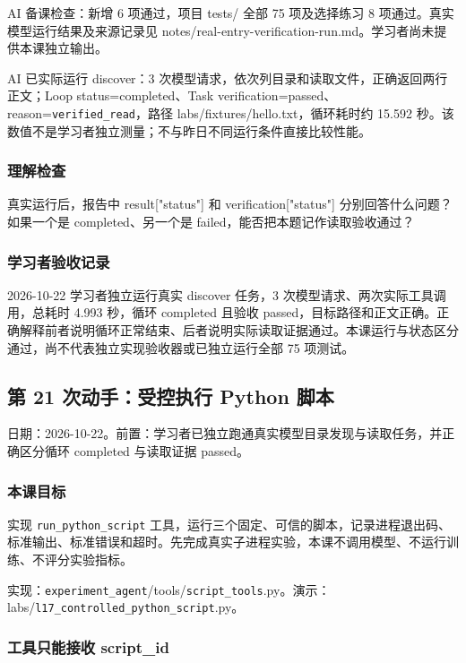 \documentclass[UTF8,zihao=-4,fontset=fandol]{ctexart}
\begin{document}
AI 备课检查：新增 6 项通过，项目 tests/ 全部 75 项及选择练习 8 项通过。真实模型运行结果及来源记录见 notes/real-entry-verification-run.md。学习者尚未提供本课独立输出。

AI 已实际运行 discover：3 次模型请求，依次列目录和读取文件，正确返回两行正文；Loop status=completed、Task verification=passed、reason=\nolinkurl{verified_read}，路径 labs/fixtures/hello.txt，循环耗时约 15.592 秒。该数值不是学习者独立测量；不与昨日不同运行条件直接比较性能。

\subsubsection{理解检查}

真实运行后，报告中 result["status"] 和 verification["status"] 分别回答什么问题？如果一个是 completed、另一个是 failed，能否把本题记作读取验收通过？

\subsubsection{学习者验收记录}

2026-10-22 学习者独立运行真实 discover 任务，3 次模型请求、两次实际工具调用，总耗时 4.993 秒，循环 completed 且验收 passed，目标路径和正文正确。正确解释前者说明循环正常结束、后者说明实际读取证据通过。本课运行与状态区分通过，尚不代表独立实现验收器或已独立运行全部 75 项测试。

\subsection{第 21 次动手：受控执行 Python 脚本}

日期：2026-10-22。前置：学习者已独立跑通真实模型目录发现与读取任务，并正确区分循环 completed 与读取证据 passed。

\subsubsection{本课目标}

实现 \nolinkurl{run_python_script} 工具，运行三个固定、可信的脚本，记录进程退出码、标准输出、标准错误和超时。先完成真实子进程实验，本课不调用模型、不运行训练、不评分实验指标。

实现：\nolinkurl{experiment_agent}/tools/\nolinkurl{script_tools}.py。演示：labs/\nolinkurl{l17_controlled_python_script}.py。

\subsubsection{工具只能接收 script\_id}
\end{document}
